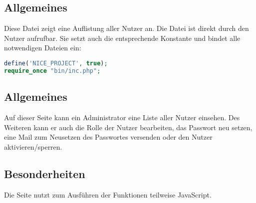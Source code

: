 \subsection{Allgemeines} Diese Datei zeigt eine Auflistung aller Nutzer an.
Die Datei ist direkt durch den Nutzer aufrufbar. Sie setzt auch die entsprechende Konstante und bindet alle notwendigen Dateien ein:
\begin{lstlisting}[language=php]
define('NICE_PROJECT', true);
require_once "bin/inc.php";
\end{lstlisting}
\subsection{Allgemeines}
Auf dieser Seite kann ein Administrator eine Liste aller Nutzer einsehen. Des Weiteren kann er auch die Rolle der Nutzer bearbeiten, das Passwort neu setzen, eine Mail zum Neusetzen des Passwortes versenden oder den Nutzer aktivieren/sperren.
\subsection{Besonderheiten}
Die Seite nutzt zum Ausführen der Funktionen teilweise JavaScript.
